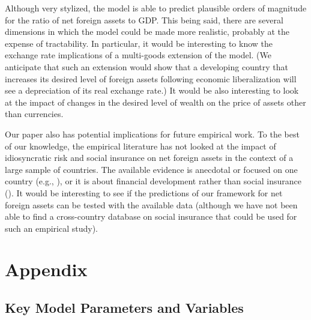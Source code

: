 \documentclass[titlepage]{\econtex}\newcommand{\texname}{cjSOE}
\begin{document}
Although very stylized, the model is able to predict plausible orders
of magnitude for the ratio of net foreign assets to GDP. This being
said, there are several dimensions in which the model could be made
more realistic, probably at the expense of tractability. In
particular, it would be interesting to know the exchange rate
implications of a multi-goods extension of the model. (We anticipate
that such an extension would show that a developing country that
increases its desired level of foreign assets following economic
liberalization will see a depreciation of its real exchange rate.)  It
would be also interesting to look at the impact of changes in the
desired level of wealth on the price of assets other than currencies.

Our paper also has potential implications for future empirical
work. To the best of our knowledge, the empirical literature has not
looked at the impact of idiosyncratic risk and social insurance on net
foreign assets in the context of a large sample of countries. The available
evidence is anecdotal or focused on one country (e.g.,
\cite{cpChina}), or it is about financial development rather than
social insurance (\cite{mqrImbal}). It would be interesting to see if
the predictions of our framework for net foreign assets can be tested
with the available data (although we have not been able to find a cross-country
database on social insurance that could be used for such an empirical study).


\pagebreak\appendix
\setcounter{section}{0}
\setcounter{subsection}{0}

\section{Appendix}

\subsection{Key Model Parameters and Variables}
\label{AppDef}
\end{document}
